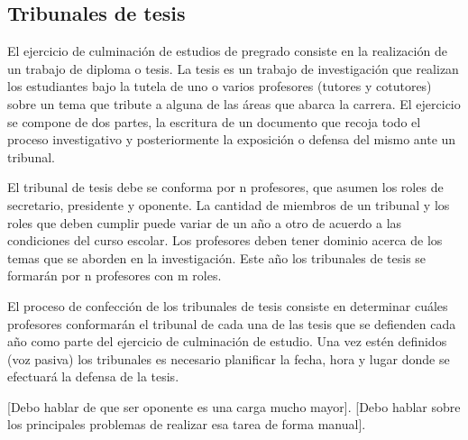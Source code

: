 



\subsection{Tribunales de tesis}

El ejercicio de culminación de estudios de pregrado consiste en la 
realización de un trabajo de diploma o tesis.
La tesis es un trabajo de investigación que realizan
los estudiantes bajo la tutela de uno o varios profesores (tutores y cotutores)
sobre un tema que tribute a alguna de las áreas que abarca la carrera.
El ejercicio se compone de dos partes, la escritura de un documento que recoja
todo el proceso investigativo y posteriormente la exposición o defensa del mismo ante 
un tribunal.

El tribunal de tesis debe se conforma por n profesores, que asumen los roles de 
secretario, presidente y oponente. La cantidad de miembros de un tribunal y los roles 
que deben cumplir puede variar de un año a otro de acuerdo a las condiciones del curso 
escolar. Los profesores deben tener 
dominio acerca de los temas que se aborden en la investigación.
Este año los tribunales de tesis se formarán por n profesores con 
m roles.

El proceso de confección de los tribunales de tesis consiste en determinar cuáles 
profesores conformarán el tribunal de cada una de las tesis que se defienden cada año como parte 
del ejercicio de culminación de estudio. Una vez estén definidos (voz pasiva) los tribunales es necesario planificar la fecha, hora y 
lugar donde se efectuará la defensa de la tesis.


[Debo hablar de que ser oponente es una carga mucho mayor].
[Debo hablar sobre los principales problemas de realizar esa tarea 
de forma manual].  \\



